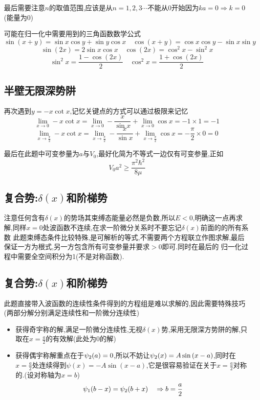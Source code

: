         最后需要注意$n$的取值范围,应该是从$n=1,2,3\cdots$不能从0开始因为$ka=0 \Rightarrow k=0$(能量为0)
        
        可能在归一化中需要用到的三角函数数学公式
        $$\sin(x+y)=\sin{x} \cos{y}+\sin{y}\cos{x} \quad \cos(x+y)=\cos{x} \cos{y} - \sin{x}\sin{y}$$ 
        $$\sin(2x) = 2\sin{x} \cos{x} \quad \cos(2x) = \cos^{2}{x} - \sin^{2}{x} $$
        $$\sin^{2}{x}=\frac{1-\cos(2x)}{2} \quad \cos^{2}{x}=\frac{1+\cos(2x)}{2} $$

    \subsection{半壁无限深势阱}
        再次遇到$y=-x \cot{x}$,记忆关键点的方式可以通过极限来记忆
        $$\lim_{x \to 0}- x \cot{x} = \lim_{x \to 0} -\frac{x}{\sin{x}} + \lim_{x \to 0}\cos{x} = -1 \times 1 = -1  $$
        $$\lim_{x \to \frac{\pi}{2}}- x \cot{x} = \lim_{x \to \frac{\pi}{2}} -\frac{x}{\sin{x}} + \lim_{x \to \frac{\pi}{2}}\cos{x} = -\frac{\pi}{2} \times 0 = 0  $$
        
        最后在此题中可变参量为$a$与$V_{0}$,最好化简为不等式一边仅有可变参量,正如
        $$V_{0}a^{2}\geq \frac{\pi^{2}\hbar^{2}}{8 \mu} $$

    \subsection{复合势:\texorpdfstring{$\delta(x)$}{}和阶梯势}
        注意任何含有$\delta(x)$的势场其束缚态能量必然是负数,所以$E<0$,明确这一点再求解,同样$x=0$处波函数不连续,在求一阶微分关系时不要忘记$\delta(x)$前面的的所有系数
        此题束缚态条件比较特殊,是可解析的等式,不需要两个方程联立作图求解,最后保证一方为根式,另一方包含所有可变参量并要求$>0$即可.同时在最后的
        归一化过程中需要全空间积分为1(不是对称函数).

    \subsection{复合势:\texorpdfstring{$\delta(x)$}{}和阶梯势}
        此题直接带入波函数的连续性条件得到的方程组是难以求解的,因此需要特殊技巧(两部分解分别满足连续性和一阶微分连续性)
        \begin{itemize}
            \item 获得奇宇称的解,满足一阶微分连续性,无视$\delta(x)$势,采用无限深方势阱的解,只取在$x=\frac{a}{2}$的有效解(此处为0的解)
            \item 获得偶宇称解重点在于$\psi_{2} (a)=0$,所以不妨让$\psi_{2} (x)=A \sin{(x-a)}$,同时在$x=\frac{a}{2}$处连续得到$\psi(x)=-A \sin{(x-a)}$,它是很容易验证在关于$x=\frac{a}{2}$对称的.(设对称轴为$x=b$)
                $$\psi_{1} (b-x)=\psi_{2} (b+x) \quad \Rightarrow b=\frac{a}{2}$$
        \end{itemize}

